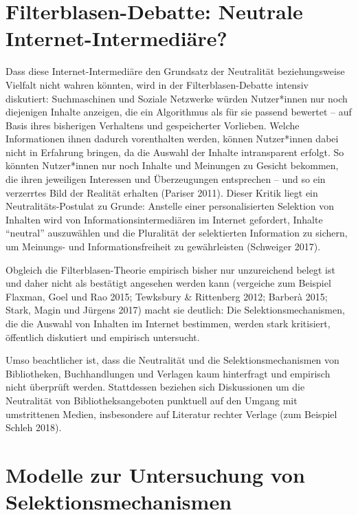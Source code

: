 \documentclass[a4paper,
fontsize=11pt,
oneside,
numbers=noperiodatend,
parskip=half-,
bibliography=totoc,
final
]{scrartcl}
\begin{document}
\hypertarget{filterblasen-debatte-neutrale-internet-intermediuxe4re}{%
\section{Filterblasen-Debatte: Neutrale
Internet-Intermediäre?}\label{filterblasen-debatte-neutrale-internet-intermediuxe4re}}

Dass diese Internet-Intermediäre den Grundsatz der Neutralität
beziehungsweise Vielfalt nicht wahren könnten, wird in der
Filterblasen-Debatte intensiv diskutiert: Suchmaschinen und Soziale
Netzwerke würden Nutzer*innen nur noch diejenigen Inhalte anzeigen, die
ein Algorithmus als für sie passend bewertet -- auf Basis ihres
bisherigen Verhaltens und gespeicherter Vorlieben. Welche Informationen
ihnen dadurch vorenthalten werden, können Nutzer*innen dabei nicht in
Erfahrung bringen, da die Auswahl der Inhalte intransparent erfolgt. So
könnten Nutzer*innen nur noch Inhalte und Meinungen zu Gesicht bekommen,
die ihren jeweiligen Interessen und Überzeugungen entsprechen -- und so
ein verzerrtes Bild der Realität erhalten (Pariser 2011). Dieser Kritik
liegt ein Neutralitäts-Postulat zu Grunde: Anstelle einer
personalisierten Selektion von Inhalten wird von
Informationsintermediären im Internet gefordert, Inhalte
\enquote{neutral} auszuwählen und die Pluralität der selektierten
Information zu sichern, um Meinungs- und Informationsfreiheit zu
gewährleisten (Schweiger 2017).

Obgleich die Filterblasen-Theorie empirisch bisher nur unzureichend
belegt ist und daher nicht als bestätigt angesehen werden kann
(vergeiche zum Beispiel Flaxman, Goel und Rao 2015; Tewksbury \&
Rittenberg 2012; Barberà 2015; Stark, Magin und Jürgens 2017) macht sie
deutlich: Die Selektionsmechanismen, die die Auswahl von Inhalten im
Internet bestimmen, werden stark kritisiert, öffentlich diskutiert und
empirisch untersucht.

Umso beachtlicher ist, dass die Neutralität und die
Selektionsmechanismen von Bibliotheken, Buchhandlungen und Verlagen kaum
hinterfragt und empirisch nicht überprüft werden. Stattdessen beziehen
sich Diskussionen um die Neutralität von Bibliotheksangeboten punktuell
auf den Umgang mit umstrittenen Medien, insbesondere auf Literatur
rechter Verlage (zum Beispiel Schleh 2018).

\hypertarget{modelle-zur-untersuchung-von-selektionsmechanismen}{%
\section{Modelle zur Untersuchung von
Selektionsmechanismen}\label{modelle-zur-untersuchung-von-selektionsmechanismen}}
\end{document}
